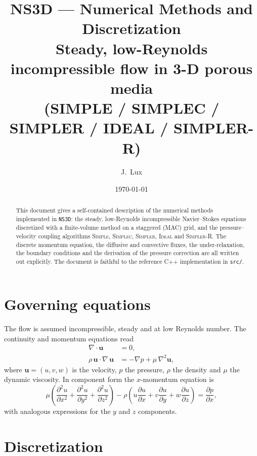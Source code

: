 \documentclass[11pt,a4paper]{article}
\title{\textbf{NS3D --- Numerical Methods and Discretization}\\[4pt]
\large Steady, low-Reynolds incompressible flow in 3-D porous media\\
\large (SIMPLE / SIMPLEC / SIMPLER / IDEAL / SIMPLER-R)}
\author{J.\ Lux}
\date{\today}
\newcommand{\vc}[1]{\mathbf{#1}}            %
\begin{document}
\maketitle

\begin{abstract}
This document gives a self-contained description of the numerical methods
implemented in \texttt{NS3D}: the steady, low-Reynolds incompressible
Navier--Stokes equations discretized with a finite-volume method on a
staggered (MAC) grid, and the pressure--velocity coupling algorithms
\textsc{Simple}, \textsc{Simplec}, \textsc{Simpler}, \textsc{Ideal} and
\textsc{Simpler-R}.  The discrete momentum equation, the diffusive and
convective fluxes, the under-relaxation, the boundary conditions and the
derivation of the pressure correction are all written out explicitly.
The document is faithful to the reference C++ implementation in
\texttt{src/}.
\end{abstract}

\tableofcontents

\section{Governing equations}

The flow is assumed incompressible, steady and at low Reynolds number.
The continuity and momentum equations read
\begin{align}
\nabla\!\cdot\!\vc{u} &= 0 , \label{eq:cont} \\[4pt]
\rho\,\vc{u}\!\cdot\!\nabla\,\vc{u}
&= -\nabla p + \mu\,\nabla^{2}\vc{u} , \label{eq:mom}
\end{align}
where $\vc{u}=(u,v,w)$ is the velocity, $p$ the pressure, $\rho$ the
density and $\mu$ the dynamic viscosity.  In component form the $x$-momentum
equation is
\begin{equation}
\mu\left(\frac{\partial^{2}u}{\partial x^{2}}
      +\frac{\partial^{2}u}{\partial y^{2}}
      +\frac{\partial^{2}u}{\partial z^{2}}\right)
 -\rho\left(u\frac{\partial u}{\partial x}
          +v\frac{\partial u}{\partial y}
          +w\frac{\partial u}{\partial z}\right)
 = \frac{\partial p}{\partial x} ,
\end{equation}
with analogous expressions for the $y$ and $z$ components.

\section{Discretization}
\end{document}
